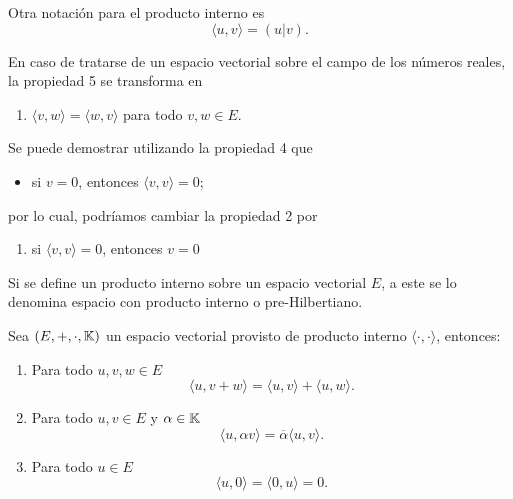 \documentclass[a4,11pt]{aleph-notas}
\begin{document}
\begin{advertencia}
    Otra notación para el producto interno es
    \[
        \langle u , v \rangle
        = (u|v).
    \]
\end{advertencia}

\begin{advertencia}
    En caso de tratarse de un espacio vectorial sobre el campo de los números reales, la propiedad 5 se transforma en
    \begin{enumerate}[start=5]
        \item
            $\langle v,w \rangle = \langle w, v \rangle$ para todo $v,w \in E$.
    \end{enumerate}
\end{advertencia}


\begin{advertencia}
    Se puede demostrar utilizando la propiedad 4 que
    \begin{itemize}
        \item
            si $v = 0$, entonces $\langle v,v \rangle = 0$;
    \end{itemize}
    por lo cual, podríamos cambiar la propiedad 2 por
    \begin{enumerate}[start=2]
        \item
            si $\langle v,v \rangle = 0$, entonces $ v = 0$
    \end{enumerate}
\end{advertencia}


Si se define un producto interno sobre un espacio vectorial $E$, a este se lo denomina espacio con producto interno o pre-Hilbertiano. 

\begin{teo}
    Sea $(E,+,\cdot,\mathbb{K})$ un espacio vectorial provisto de producto interno $\langle \cdot, \cdot \rangle$, entonces:
    \begin{enumerate}
        \item 
            Para todo $u,v,w \in E$ 
            \[\langle u, v+w\rangle = \langle u,v\rangle + \langle u, w \rangle.\]
        \item 
            Para todo $u,v \in E$ y $\alpha \in \mathbb{K}$
            \[\langle u, \alpha v\rangle =  \overline{\alpha}\langle u,v\rangle.\]
        \item
            Para todo $u\in E$ 
            \[\langle u, 0 \rangle =  \langle 0, u \rangle  = 0.\]
    \end{enumerate}
\end{teo}
\end{document}
